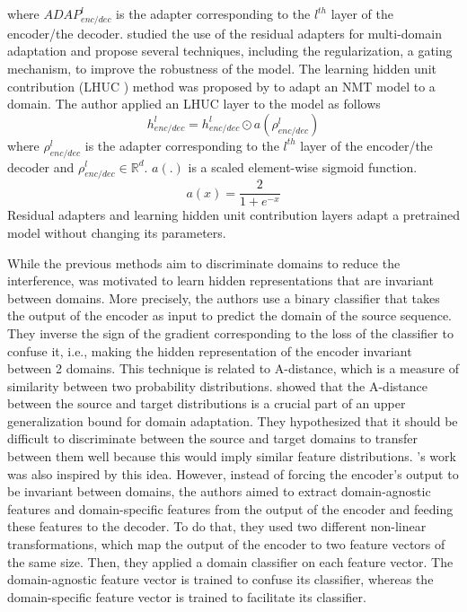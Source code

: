 where $ADAP_{enc/dec}^l$ is the adapter corresponding to the $l^{th}$ layer of the encoder/the decoder. \citet{Pham20Study} studied the use of the residual adapters for multi-domain adaptation and propose several techniques, including the regularization, a gating mechanism, to improve the robustness of the model. The learning hidden unit contribution (LHUC ) method was proposed by \citet{Vilar18learning} to adapt an NMT model to a domain. The author applied an LHUC layer to the model as follows
\begin{equation}
h_{enc/dec}^l = h_{enc/dec}^{l} \odot a(\rho^{l}_{enc/dec})
\end{equation}
where $\rho^{l}_{enc/dec}$ is the adapter corresponding to the $l^{th}$ layer of the encoder/the decoder and $\rho^{l}_{enc/dec} \in \mathbb{R}^d$. $a(.)$ is a scaled
element-wise sigmoid function.
$$a(x) = \frac{2}{1+e^{-x}}$$
Residual adapters and learning hidden unit contribution layers adapt a pretrained model without changing its parameters. 

While the previous methods aim to discriminate domains to reduce the interference,\citet{Britz17effective} was motivated to learn hidden representations that are invariant between domains. More precisely, the authors use a binary classifier that takes the output of the encoder as input to predict the domain of the source sequence. They inverse the sign of the gradient corresponding to the loss of the classifier to confuse it, i.e., making the hidden representation of the encoder invariant between 2 domains. This technique is related to A-distance, which is a measure of similarity between two probability distributions. \citet{Ben07analysis} showed that the A-distance between the source and target distributions is a crucial part of an upper generalization bound for domain adaptation. They hypothesized that it should be difficult to discriminate between the source and target domains to transfer between them well because this would imply similar feature distributions. \citet{Zeng18multidomain}'s work was also inspired by this idea. However, instead of forcing the encoder's output to be invariant between domains, the authors aimed to extract domain-agnostic features and domain-specific features from the output of the encoder and feeding these features to the decoder. To do that, they used two different non-linear transformations, which map the output of the encoder to two feature vectors of the same size. Then, they applied a domain classifier on each feature vector. The domain-agnostic feature vector is trained to confuse its classifier, whereas the domain-specific feature vector is trained to facilitate its classifier.

